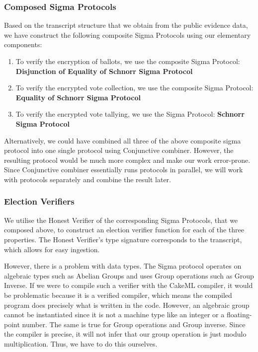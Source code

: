     \subsubsection{Composed Sigma Protocols}
    Based on the transcript structure that we obtain from the public evidence data, we have construct the following composite Sigma Protocols using our elementary components:
    \begin{enumerate}
    \item To verify the encryption of ballots, we use the composite Sigma Protocol: 
    \textbf{Disjunction of Equality of Schnorr Sigma Protocol}
    \item To verify the encrypted vote collection, we use the composite Sigma Protocol: 
    \textbf{Equality of Schnorr Sigma Protocol}
    \item To verify the encrypted vote tallying, we use the Sigma Protocol: 
    \textbf{Schnorr Sigma Protocol}
    \end{enumerate}
    Alternatively, we could have combined all three of the above composite sigma protocol into one single protocol using Conjunctive combiner. However, the resulting protocol would be much more complex and make our work error-prone. Since Conjunctive combiner essentially runs protocols in parallel, we will work with protocols separately and combine the result later.

    \subsubsection{Election Verifiers}
    We utilise the Honest Verifier of the corresponding Sigma Protocols, that we composed above, to construct an election verifier function for each of the three properties. The Honest Verifier's type signature corresponds to the transcript, which allows for easy ingestion.

    However, there is a problem with data types. The Sigma protocol operates on algebraic types such as Abelian Groups and uses Group operations such as Group Inverse. If we were to compile such a verifier with the CakeML compiler, it would be problematic because it is a verified compiler, which means the compiled program does precisely what is written in the code. However, an algebraic group cannot be instantiated since it is not a machine type like an integer or a floating-point number. The same is true for Group operations and Group inverse. Since the compiler is precise, it will not infer that our group operation is just modulo multiplication. Thus, we have to do this ourselves.
    
